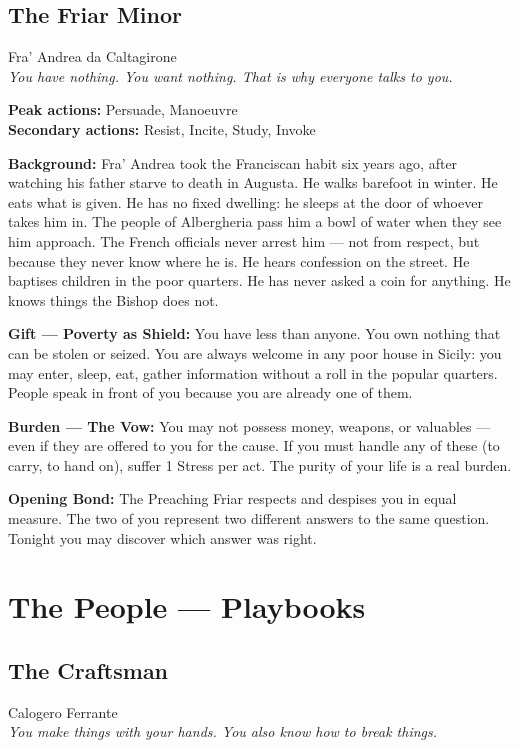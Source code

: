 \filetto

\subsection{The Friar Minor}
{\cinzel\footnotesize\color{grigionote} Fra' Andrea da Caltagirone}\\
\textit{You have nothing. You want nothing. That is why everyone
talks to you.}

\textbf{Peak actions:} Persuade, Manoeuvre\\
\textbf{Secondary actions:} Resist, Incite, Study, Invoke

\textbf{Background:} Fra' Andrea took the Franciscan habit six
years ago, after watching his father starve to death in Augusta.
He walks barefoot in winter. He eats what is given. He has no
fixed dwelling: he sleeps at the door of whoever takes him in.
The people of Albergheria pass him a bowl of water when they see
him approach. The French officials never arrest him --- not from
respect, but because they never know where he is. He hears
confession on the street. He baptises children in the poor
quarters. He has never asked a coin for anything. He knows things
the Bishop does not.

\textbf{Gift --- Poverty as Shield:} You have less than anyone.
You own nothing that can be stolen or seized. You are always
welcome in any poor house in Sicily: you may enter, sleep, eat,
gather information without a roll in the popular quarters.
People speak in front of you because you are already one of them.

\textbf{Burden --- The Vow:} You may not possess money, weapons,
or valuables --- even if they are offered to you for the cause.
If you must handle any of these (to carry, to hand on), suffer
1 Stress per act. The purity of your life is a real burden.

\textbf{Opening Bond:} The Preaching Friar respects and despises
you in equal measure. The two of you represent two different
answers to the same question. Tonight you may discover which
answer was right.

\secsep

\section{The People — Playbooks}

\subsection{The Craftsman}
{\cinzel\footnotesize\color{grigionote} Calogero Ferrante}\\
\textit{You make things with your hands. You also know how to break things.}


